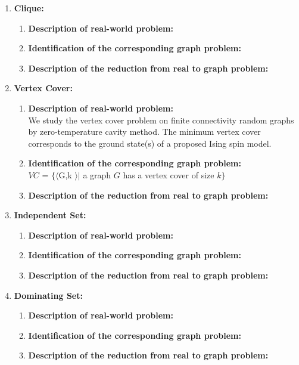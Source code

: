 \documentclass[article, 10pt,onecolumn]{article}
\begin{document}
\begin{enumerate}
\item \textbf{Clique:}
 \begin{enumerate}
   \item \textbf{Description of real-world problem:} 
   \item \textbf{Identification of the corresponding graph problem:} 
   \item \textbf{Description of the reduction from real to graph problem:} 
  \end{enumerate}
  
\item \textbf{Vertex Cover:}
  \begin{enumerate}
   \item \textbf{Description of real-world problem:}\\
    We study the vertex cover problem on finite connectivity random graphs by zero-temperature cavity method. The minimum vertex cover
    corresponds to the ground state(s) of a proposed Ising spin model.\cite{Vertex}
   \item \textbf{Identification of the corresponding graph problem:}\\
    $VC$ = $\{\langle $G,k $ \rangle | $ a graph $G$ has a vertex cover of size $k\}$ \\
   \item \textbf{Description of the reduction from real to graph problem:} 
  \end{enumerate}

\item \textbf{Independent Set:}
 \begin{enumerate}
   \item \textbf{Description of real-world problem:} 
   \item \textbf{Identification of the corresponding graph problem:} 
   \item \textbf{Description of the reduction from real to graph problem:} 
  \end{enumerate}
  
\item \textbf{Dominating Set:}
 \begin{enumerate}
   \item \textbf{Description of real-world problem:} 
   \item \textbf{Identification of the corresponding graph problem:} 
   \item \textbf{Description of the reduction from real to graph problem:} 
  \end{enumerate}
  

\end{enumerate}
\end{document}
